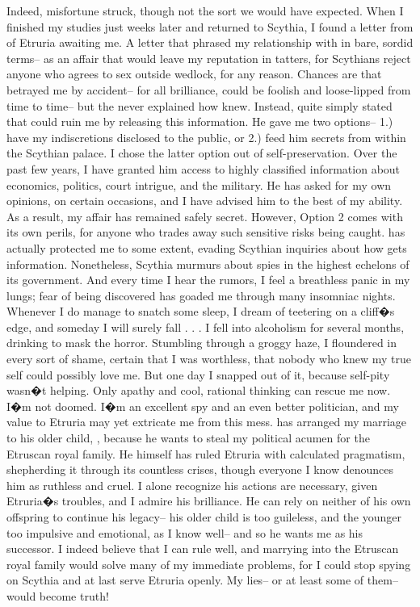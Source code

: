 \documentclass[char]{Kos}
\begin{document}
Indeed, misfortune struck, though not the sort we would have expected. When I finished my studies just weeks later and returned to Scythia, I found a letter from \cEtruriaKing{\Monarch} \cEtruriaKing{\nickname} of Etruria awaiting me. A letter that phrased my relationship with \cPoet{\nickname} in bare, sordid terms-- as an affair that would leave my reputation in tatters, for Scythians reject anyone who agrees to sex outside wedlock, for any reason. Chances are that \cPoet{\nickname} betrayed me by accident-- for all \cPoet{\their} brilliance, \cPoet{\they} could be foolish and loose-lipped from time to time-- but the \cEtruriaKing{\monarch} never explained how \cEtruriaKing{\they} knew. Instead, \cEtruriaKing{\They} quite simply stated that \cEtruriaKing{\they} could ruin me by releasing this information. He gave me two options-- 1.) have my indiscretions disclosed to the public, or 2.) feed him secrets from within the Scythian palace. I chose the latter option out of self-preservation. Over the past few years, I have granted him access to highly classified information about economics, politics, court intrigue, and the military. He has asked for my own opinions, on certain occasions, and I have advised him to the best of my ability. As a result, my affair has remained safely secret. 
However, Option 2 comes with its own perils, for anyone who trades away such sensitive risks being caught. \cEtruriaKing{}  has actually protected me to some extent, evading Scythian inquiries about how \cEtruriaKing{\they} gets \cEtruriaKing{\their} information. Nonetheless, Scythia murmurs about spies in the highest echelons of its government. And every time I hear the rumors, I feel a breathless panic in my lungs; fear of being discovered has goaded me through many insomniac nights. Whenever I do manage to snatch some sleep, I dream of teetering on a cliff�s edge, and someday I will surely fall . . .
I fell into alcoholism for several months, drinking to mask the horror. Stumbling through a groggy haze, I floundered in every sort of shame, certain that I was worthless, that nobody who knew my true self could possibly love me. But one day I snapped out of it, because self-pity wasn�t helping. Only apathy and cool, rational thinking can rescue me now.
	I�m not doomed. I�m an excellent spy and an even better politician, and my value to Etruria may yet extricate me from this mess. \cEtruriaKing{\nickname} has arranged my marriage to his older child, \cGroom{\nickname}, because he wants to steal my political acumen for the Etruscan royal family. He himself has ruled Etruria with calculated pragmatism, shepherding it through its countless crises, though everyone I know denounces him as ruthless and cruel. I alone recognize his actions are necessary, given Etruria�s troubles, and I admire his brilliance. He can rely on neither of his own offspring to continue his legacy-- his older child is too guileless, and the younger too impulsive and emotional, as I know well-- and so he wants me as his successor. I indeed believe that I can rule well, and marrying into the Etruscan royal family would solve many of my immediate problems, for I could stop spying on Scythia and at last serve Etruria openly. My lies-- or at least some of them-- would become truth!
\end{document}

